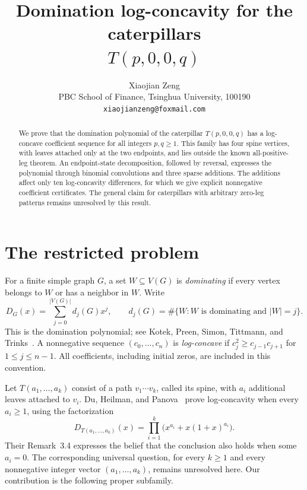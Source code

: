 \documentclass[11pt,a4paper]{article}
\title{Domination log-concavity for the caterpillars\\$T(p,0,0,q)$}
\author{Xiaojian Zeng\\[3pt]
  \small PBC School of Finance, Tsinghua University, 100190\\
  \small\texttt{xiaojianzeng@foxmail.com}}
\date{}
\begin{document}
\maketitle

\begin{abstract}
We prove that the domination polynomial of the caterpillar $T(p,0,0,q)$
has a log-concave coefficient sequence for all integers $p,q\geq1$.
This family has four spine vertices, with leaves attached only at the two
endpoints, and lies outside the known all-positive-leg theorem.
An endpoint-state decomposition, followed by reversal, expresses the polynomial
through binomial convolutions and three sparse additions. The additions affect
only ten log-concavity differences, for which we give explicit nonnegative
coefficient certificates. The general claim for caterpillars with arbitrary
zero-leg patterns remains unresolved by this result.
\end{abstract}

\section{The restricted problem}

For a finite simple graph $G$, a set $W\subseteq V(G)$ is \emph{dominating}
if every vertex belongs to $W$ or has a neighbor in $W$. Write
\[
  D_G(x)=\sum_{j=0}^{|V(G)|}d_j(G)x^j,
  \qquad d_j(G)=\#\{W: W\text{ is dominating and }|W|=j\}.
\]
This is the domination polynomial; see Kotek, Preen, Simon, Tittmann,
and Trinks~\cite[Definition~1.1]{Kotek2012}.
A nonnegative sequence $(c_0,\ldots,c_n)$ is \emph{log-concave} if
$c_j^2\geq c_{j-1}c_{j+1}$ for $1\leq j\leq n-1$.
All coefficients, including initial zeros, are included in this convention.

Let $T(a_1,\ldots,a_k)$ consist of a path $v_1\cdots v_k$, called its
spine, with $a_i$ additional leaves attached to $v_i$.
Du, Heilman, and Panova~\cite[Theorem~3.3]{Du2026} prove log-concavity when
every $a_i\geq1$, using the factorization
\begin{equation}\label{eq:positive}
  D_{T(a_1,\ldots,a_k)}(x)
    =\prod_{i=1}^k\bigl(x^{a_i}+x(1+x)^{a_i}\bigr).
\end{equation}
Their Remark~3.4 expresses the belief that the conclusion also holds when
some $a_i=0$. The corresponding universal question, for every $k\geq1$
and every nonnegative integer vector $(a_1,\ldots,a_k)$, remains unresolved
here. Our contribution is the following proper subfamily.
\end{document}
